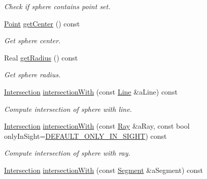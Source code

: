 \begin{DoxyCompactItemize}
\begin{DoxyCompactList}\small\item\em Check if sphere contains point set. \end{DoxyCompactList}\item 
\hyperlink{classostk_1_1math_1_1geom_1_1d3_1_1objects_1_1_point}{Point} \hyperlink{classostk_1_1math_1_1geom_1_1d3_1_1objects_1_1_sphere_aa99591327b0fe9aac8f03dc34b41207a}{get\+Center} () const
\begin{DoxyCompactList}\small\item\em Get sphere center. \end{DoxyCompactList}\item 
Real \hyperlink{classostk_1_1math_1_1geom_1_1d3_1_1objects_1_1_sphere_a856d4bceb6c0e3133aced9eab57d6450}{get\+Radius} () const
\begin{DoxyCompactList}\small\item\em Get sphere radius. \end{DoxyCompactList}\item 
\hyperlink{classostk_1_1math_1_1geom_1_1d3_1_1_intersection}{Intersection} \hyperlink{classostk_1_1math_1_1geom_1_1d3_1_1objects_1_1_sphere_afbae10b116900f5383913e564c0ec91a}{intersection\+With} (const \hyperlink{classostk_1_1math_1_1geom_1_1d3_1_1objects_1_1_line}{Line} \&a\+Line) const
\begin{DoxyCompactList}\small\item\em Compute intersection of sphere with line. \end{DoxyCompactList}\item 
\hyperlink{classostk_1_1math_1_1geom_1_1d3_1_1_intersection}{Intersection} \hyperlink{classostk_1_1math_1_1geom_1_1d3_1_1objects_1_1_sphere_a204e67d24679bed63ab54cafda683918}{intersection\+With} (const \hyperlink{classostk_1_1math_1_1geom_1_1d3_1_1objects_1_1_ray}{Ray} \&a\+Ray, const bool only\+In\+Sight=\hyperlink{_sphere_8hpp_af424617f7c785f4835e2feba5a5640f2}{D\+E\+F\+A\+U\+L\+T\+\_\+\+O\+N\+L\+Y\+\_\+\+I\+N\+\_\+\+S\+I\+G\+HT}) const
\begin{DoxyCompactList}\small\item\em Compute intersection of sphere with ray. \end{DoxyCompactList}\item 
\hyperlink{classostk_1_1math_1_1geom_1_1d3_1_1_intersection}{Intersection} \hyperlink{classostk_1_1math_1_1geom_1_1d3_1_1objects_1_1_sphere_a90b0be4e76f556042518b92fd29f0edf}{intersection\+With} (const \hyperlink{classostk_1_1math_1_1geom_1_1d3_1_1objects_1_1_segment}{Segment} \&a\+Segment) const

\end{DoxyCompactItemize}
